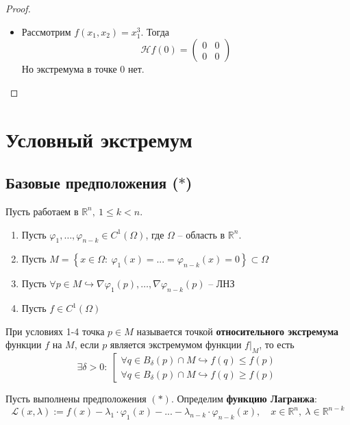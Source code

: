 \documentclass[11pt]{article}
\begin{document}
\begin{proof}
\begin{enumerate}
\begin{itemize}
            \item Рассмотрим $f(x_1, x_2) = x^3_1$. Тогда 
            \[\mathcal{H}f(0) = \begin{pmatrix}
                0 & 0 \\ 0 & 0
            \end{pmatrix}\]
            Но экстремума в точке $0$ нет.
        \end{itemize}
    \end{enumerate}
\end{proof}

\section{Условный экстремум}

\subsection*{Базовые предположения ($\ast$)}
\mbox{} Пусть работаем в $\mathbb{R}^n, \ 1 \leq k < n$.
\begin{enumerate}
    \item Пусть $\varphi_1, \dots, \varphi_{n-k} \in C^1(\Omega)$, где $\Omega$ --
    область в $\mathbb{R}^n$.
    \item Пусть $M = \left\{x \in \Omega: \ \varphi_1(x) = ... = \varphi_{n-k}
    (x) = 0\right\} \subset \Omega$
    \item Пусть $\forall p \in M \hookrightarrow \nabla\varphi_1(p), \dots, \nabla\varphi_{n-k}(p)$ -- ЛНЗ
    \item Пусть $f \in C^1(\Omega)$
\end{enumerate}

\begin{definition}
    При условиях 1-4 точка $p \in M$ называется точкой \textbf{относительного экстремума} функции $f$ на $M$, 
    если $p$ является экстремумом функции $f|_M$, то есть 
    \[ \exists \delta > 0: \ \left[
        \begin{array}{c}
            \forall q \in B_\delta(p) \cap M \hookrightarrow f(q) \leq f(p) \\
            \forall q \in B_\delta(p) \cap M \hookrightarrow f(q) \geq f(p)
        \end{array}
    \right.\]
\end{definition}

\begin{definition}
    Пусть выполнены предположения $(\ast)$. Определим \textbf{функцию Лагранжа}: \[\mathcal{L}(x, \lambda) := f(x) - \lambda_1 \cdot \varphi_1(x) - ... -
    \lambda_{n-k} \cdot \varphi_{n-k}(x), \quad x \in \mathbb{R}^n, \ \lambda \in \mathbb{R}^{n-k}\]
\end{definition}
\end{document}
